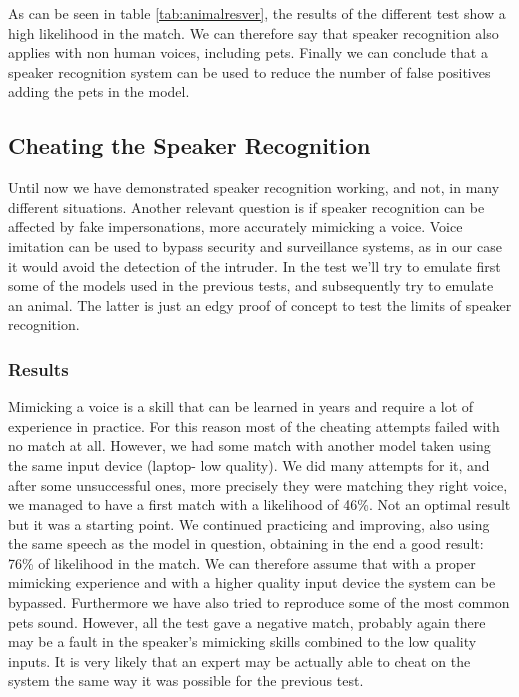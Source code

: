 As can be seen in table \ref{tab:animalresver}, the results of the different test
show a high likelihood in the match. We can therefore say that speaker recognition
also applies with non human voices, including pets.\newline
Finally we can conclude that a speaker recognition system can be used to reduce the number
of false positives adding the pets in the model.


\subsection{Cheating the Speaker Recognition}

Until now we have demonstrated speaker recognition working, and not, in many different situations.
Another relevant question is if speaker recognition can be affected by fake impersonations,
more accurately mimicking a voice. Voice imitation can be used to bypass security and
surveillance systems, as in our case it would avoid the detection of the intruder.\newline
In the test we'll try to emulate first some of the models used in the previous tests, and subsequently
try to emulate an animal. The latter is just an edgy proof of concept to test the limits of speaker recognition.

\subsubsection{Results}

Mimicking a voice is a skill that can be learned in years and require a lot of experience in practice.
For this reason most of the cheating attempts failed with no match at all. However, we had some match
with another model taken using the same input device (laptop- low quality). We did many attempts for it, and
after some unsuccessful ones, more precisely they were matching they right voice, we managed to have a first
match with a likelihood of 46\%. Not an optimal result but it was a starting point. We continued practicing and
improving, also using the same speech as the model in question, obtaining in the end a good result: 76\% of likelihood
in the match. We can therefore assume that with a proper mimicking experience and with a higher quality input device
the system can be bypassed.\newline
Furthermore we have also tried to reproduce some of the most common pets sound. However, all the test
gave a negative match, probably again there may be a fault in the speaker's mimicking skills combined
to the low quality inputs. It is very likely that an expert may be actually able to cheat on the system the
same way it was possible for the previous test.


